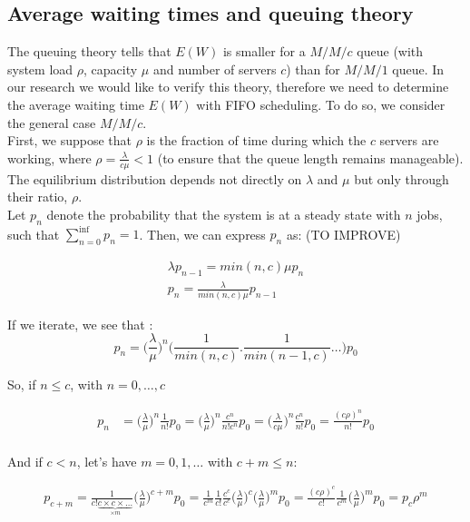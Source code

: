 \documentclass{article}
\begin{document}
    \subsection*{Average waiting times and queuing theory}

    The queuing theory tells that $E(W)$ is smaller for a $M/M/c$ queue (with system load $\rho$, capacity $\mu$ and number of servers $c$) than for $M/M/1$ queue. In our research we would like to verify this theory, therefore we need to determine the average waiting time $E(W)$ with FIFO scheduling. To do so, we consider the general case $M/M/c$.\\
    First, we suppose that $\rho$ is the fraction of time during which the $c$ servers are working, where $\rho = \frac{\lambda}{c\mu} < 1$ (to ensure that the queue length remains manageable). The equilibrium distribution depends not directly on $\lambda$ and $\mu$ but only through their ratio, $\rho$.\\
    Let $p_n$ denote the probability that the system is at a steady state with $n$ jobs, such that $\sum_{n=0}^{\inf} p_n = 1$.
    Then, we can express $p_n$ as: (TO IMPROVE)

    \begin{align}
        \lambda p_{n-1} = min(n, c) \mu p_n \\
        p_n = \frac{\lambda}{min(n, c) \mu} p_{n - 1}
    \end{align}

    If we iterate, we see that :
    \begin{equation}
        p_n = \Big(\frac{\lambda}{\mu} \Big)^n \Big(\frac{1}{min(n, c)} .  \frac{1}{min(n - 1, c)} \ldots \Big) p_0
    \end{equation}

    So, if $n \leq c$, with $n = 0, \ldots, c$

    \begin{align}
        p_n &= \Big( \frac{\lambda}{\mu} \Big)^n \frac{1}{n!} p_0
        = \Big( \frac{\lambda}{\mu} \Big)^n \frac{c^n}{n! c^n} p_0
        = \Big( \frac{\lambda}{c \mu} \Big)^n \frac{c^n}{n!} p_0
        = \frac{(c \rho)^n}{n!} p_0\\
    \end{align}

    And if $c < n$, let's have $m = 0, 1, \ldots$ with $c + m \leq n$:

    \begin{align}
        p_{c + m} = \frac{1}{c! \underbrace{c \times c \times \ldots}_{\times m}} \Big( \frac{\lambda}{\mu} \Big)^{c + m} p_0
        = \frac{1}{c^m} \frac{1}{c!} \frac{c^c}{c^c} \Big( \frac{\lambda}{\mu} \Big)^c \Big( \frac{\lambda}{\mu} \Big)^m p_0
        = \frac{(c \rho)^c}{c!} \frac{1}{c^m} \Big( \frac{\lambda}{\mu} \Big)^m p_0
        = p_c \rho^m
    \end{align}
\end{document}
